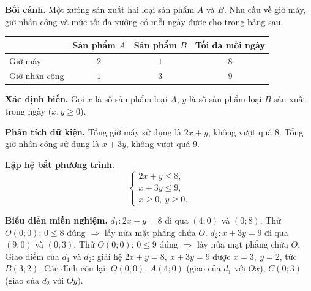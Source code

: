 \documentclass[12pt,a4paper]{report}
\begin{document}
\begin{applicationbox}
\textbf{Bối cảnh.} Một xưởng sản xuất hai loại sản phẩm $A$ và $B$. Nhu cầu về giờ máy, giờ nhân công và mức tối đa xưởng có mỗi ngày được cho trong bảng sau.

\begin{center}
\renewcommand{\arraystretch}{1.25}
\begin{tabular}{|l|c|c|c|}
\hline
 & \textbf{Sản phẩm $A$} & \textbf{Sản phẩm $B$} & \textbf{Tối đa mỗi ngày} \\
\hline
Giờ máy & $2$ & $1$ & $8$ \\
\hline
Giờ nhân công & $1$ & $3$ & $9$ \\
\hline
\end{tabular}
\end{center}

\textbf{Xác định biến.} Gọi $x$ là số sản phẩm loại $A$, $y$ là số sản phẩm loại $B$ sản xuất trong ngày ($x,y\ge 0$).

\textbf{Phân tích dữ kiện.} Tổng giờ máy sử dụng là $2x+y$, không vượt quá $8$. Tổng giờ nhân công sử dụng là $x+3y$, không vượt quá $9$.

\textbf{Lập hệ bất phương trình.}
\[
\begin{cases}
2x+y\le 8,\\
x+3y\le 9,\\
x\ge 0,\ y\ge 0.
\end{cases}
\]

\textbf{Biểu diễn miền nghiệm.} $d_1: 2x+y=8$ đi qua $(4;0)$ và $(0;8)$. Thử $O(0;0)$: $0\le 8$ đúng $\Rightarrow$ lấy nửa mặt phẳng chứa $O$. $d_2: x+3y=9$ đi qua $(9;0)$ và $(0;3)$. Thử $O(0;0)$: $0\le 9$ đúng $\Rightarrow$ lấy nửa mặt phẳng chứa $O$. Giao điểm của $d_1$ và $d_2$: giải hệ $2x+y=8,\ x+3y=9$ được $x=3,\ y=2$, tức $B(3;2)$. Các đỉnh còn lại: $O(0;0)$, $A(4;0)$ (giao của $d_1$ với $Ox$), $C(0;3)$ (giao của $d_2$ với $Oy$).

\begin{center}
\end{center}
\end{applicationbox}
\end{document}
